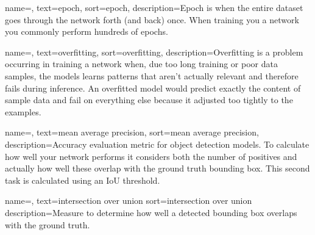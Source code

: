 {
	name=,
	text=epoch,
	sort=epoch,
	description={Epoch is when the entire dataset goes through the network forth (and back) once. When training you a network you commonly perform hundreds of epochs.}
}

{
	name=,
	text=overfitting,
	sort=overfitting,
	description={Overfitting is a problem occurring in training a network when, due too long training or poor data samples, the models learns patterns that aren't actually relevant and therefore fails during inference. An overfitted model would predict exactly the content of sample data and fail on everything else because it adjusted too tightly to the examples.}
}

{
	name=,
	text=mean average precision,
	sort=mean average precision,
	description={Accuracy evaluation metric for object detection models. To calculate how well your network performs it considers both the number of positives and actually how well these overlap with the ground truth bounding box. This second task is calculated using an IoU threshold.}
}

{
	name=,
	text=intersection over union
	sort=intersection over union
	description={Measure to determine how well a detected bounding box overlaps with the ground truth.}
}




